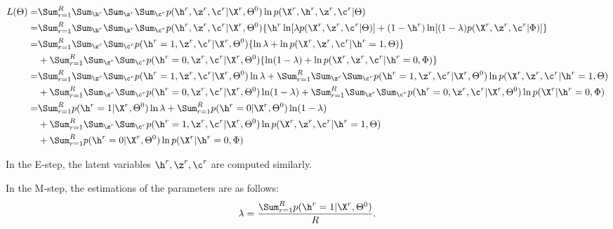 \begin{align*}
  L(\Theta)
  = & \Sum_{r=1}^R \Sum_{\h^r} \Sum_{\z^r} \Sum_{\c^r} p(\h^r, \z^r, \c^r| \X^r, \Theta^0)
  \ln p(\X^r, \h^r, \z^r, \c^r| \Theta) \\
  = & \Sum_{r=1}^R \Sum_{\h^r} \Sum_{\z^r} \Sum_{\c^r} p(\h^r, \z^r, \c^r| \X^r, \Theta^0)
  \{\h^r \ln [\lambda p(\X^r, \z^r, \c^r| \Theta)] + (1 - \h^r) \ln [ (1 - \lambda) p(\X^r, \z^r, \c^r| \Phi)] \}\\
  = &  \Sum_{r=1}^R \Sum_{\z^r} \Sum_{\c^r} p(\h^r = 1, \z^r, \c^r| \X^r, \Theta^0) 
  \{ \ln \lambda  + \ln p(\X^r, \z^r, \c^r| \h^r=1, \Theta) \}\\
  &  + \Sum_{r=1}^R \Sum_{\z^r} \Sum_{\c^r} p(\h^r = 0, \z^r, \c^r| \X^r, \Theta^0) 
  \{ \ln (1 - \lambda)  + \ln p(\X^r, \z^r, \c^r| \h^r=0, \Phi) \} \\
  = &  \Sum_{r=1}^R \Sum_{\z^r} \Sum_{\c^r} p(\h^r = 1, \z^r, \c^r| \X^r, \Theta^0) \ln \lambda
     + \Sum_{r=1}^R \Sum_{\z^r} \Sum_{\c^r} p(\h^r = 1, \z^r, \c^r| \X^r, \Theta^0) \ln p(\X^r, \z^r, \c^r| \h^r=1, \Theta) \\
    & + \Sum_{r=1}^R \Sum_{\z^r} \Sum_{\c^r} p(\h^r = 0, \z^r, \c^r| \X^r, \Theta^0) \ln (1 - \lambda)
    + \Sum_{r=1}^R \Sum_{\z^r} \Sum_{\c^r} p(\h^r = 0, \z^r, \c^r| \X^r, \Theta^0) \ln p(\X^r| \h^r=0, \Phi) \\
  = & \Sum_{r=1}^R p(\h^r = 1| \X^r, \Theta^0) \ln \lambda + \Sum_{r=1}^R p(\h^r = 0| \X^r, \Theta^0) \ln (1 - \lambda) \\
   &  + \Sum_{r=1}^R \Sum_{\z^r} \Sum_{\c^r} p(\h^r = 1, \z^r, \c^r| \X^r, \Theta^0) \ln p(\X^r, \z^r, \c^r| \h^r=1, \Theta) \\
    & + \Sum_{r=1}^R p(\h^r = 0| \X^r, \Theta^0) \ln p(\X^r| \h^r=0, \Phi)
\end{align*}


In the E-step, the latent variables $\h^r, \z^r, \c^r$ are computed similarly.

In the M-step, the estimations of the parameters are as follows:
$$
\lambda = \frac{\Sum_{r=1}^R p(\h^r = 1| \X^r, \Theta^0) }{R}.
$$

